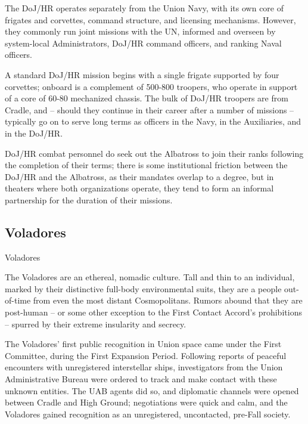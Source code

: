 The DoJ/HR operates separately from the Union Navy, with its own core of frigates and corvettes,  
command structure, and licensing mechanisms. However, they commonly run joint missions with  
the UN, informed and overseen by system-local Administrators, DoJ/HR command officers, and  
ranking Naval officers.       

A standard DoJ/HR mission begins with a single frigate supported by four corvettes; onboard is a  
complement of 500-800 troopers, who operate in support of a core of 60-80 mechanized chassis.  
The bulk of DoJ/HR troopers are from Cradle, and -- should they continue in their career after a  
number of missions -- typically go on to serve long terms as officers in the Navy, in the Auxiliaries,  
and in the DoJ/HR.   

DoJ/HR combat personnel do seek out the Albatross to join their ranks following the completion of  
their terms; there is some institutional friction between the DoJ/HR and the Albatross, as their  
mandates overlap to a degree, but in theaters where both organizations operate, they tend to form  
an informal partnership for the duration of their missions.   

                                                                                                         

\subsection{Voladores}
  
Voladores   

The Voladores are an ethereal, nomadic culture. Tall and thin to an individual, marked by their  
distinctive full-body environmental suits, they are a people out-of-time from even the most  
distant Cosmopolitans. Rumors abound that they are post-human -- or some other exception to  
the First Contact Accord’s prohibitions -- spurred by their extreme insularity and secrecy. 
 

The Voladores’ first public recognition in Union space came under the First Committee, during  
the First Expansion Period. Following reports of peaceful encounters with unregistered  
interstellar ships, investigators from the Union Administrative Bureau were ordered to track and  
make contact with these unknown entities. The UAB agents did so, and diplomatic channels  
were opened between Cradle and High Ground; negotiations were quick and calm, and the  
Voladores gained recognition as an unregistered, uncontacted, pre-Fall society.
 

